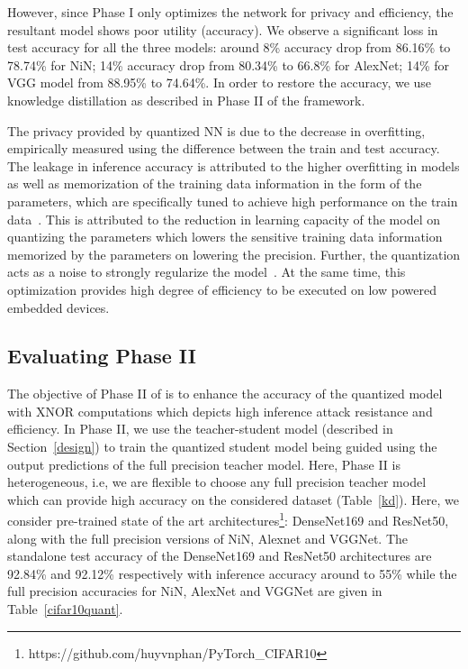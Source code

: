 However, since Phase I only optimizes the network for privacy and efficiency, the resultant model shows poor utility (accuracy).
We observe a significant loss in test accuracy for all the three models: around 8\% accuracy drop from 86.16\% to 78.74\% for NiN; 14\% accuracy drop from 80.34\% to 66.8\% for AlexNet; 14\% for VGG model from 88.95\% to 74.64\%.
In order to restore the accuracy, we use knowledge distillation as described in Phase II of the \method\hspace{0.02in} framework.

The privacy provided by quantized NN is due to the decrease in overfitting, empirically measured using the difference between the train and test accuracy.
The leakage in inference accuracy is attributed to the higher overfitting in models as well as memorization of the training data information in the form of the parameters, which are specifically tuned to achieve high performance on the train data~\cite{10.1145/3133956.3134077,236216,DBLP:journals/corr/abs-1812-00910}.
This is attributed to the reduction in learning capacity of the model on quantizing the parameters which lowers the sensitive training data information memorized by the parameters on lowering the precision.
Further, the quantization acts as a noise to strongly regularize the model~\cite{NIPS2016_6573}.
At the same time, this optimization provides high degree of efficiency to be executed on low powered embedded devices.

\subsection{Evaluating Phase II}
\label{evalPh2}

The objective of Phase II of \method\hspace{0.02in} is to enhance the accuracy of the quantized model with XNOR computations which depicts high inference attack resistance and efficiency.
In Phase II, we use the teacher-student model (described in Section~\ref{design}) to train the quantized student model being guided using the output predictions of the full precision teacher model.
Here, Phase II is heterogeneous, i.e, we are flexible to choose any full precision teacher model which can provide high accuracy on the considered dataset (Table~\ref{kd}).
Here, we consider pre-trained state of the art architectures\footnote{https://github.com/huyvnphan/PyTorch\_CIFAR10}: DenseNet169 and ResNet50, along with the full precision versions of NiN, Alexnet and VGGNet.
The standalone test accuracy of the DenseNet169 and ResNet50 architectures are 92.84\% and 92.12\% respectively with inference accuracy around to 55\% while the full precision accuracies for NiN, AlexNet and VGGNet are given in Table~\ref{cifar10quant}.


